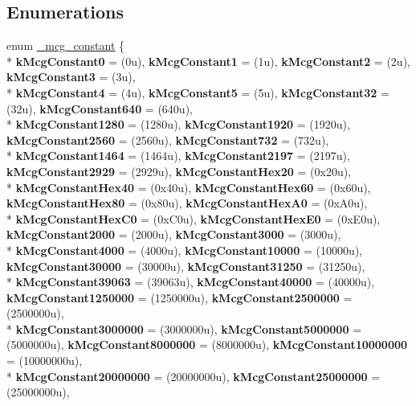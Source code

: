 \subsection*{Enumerations}
\begin{DoxyCompactItemize}
\item 
enum \hyperlink{group__mcg__hal_gaadd12e80f98bc09e584342e08503ba56}{\+\_\+mcg\+\_\+constant} \{ \\*
{\bfseries k\+Mcg\+Constant0} = (0u), 
{\bfseries k\+Mcg\+Constant1} = (1u), 
{\bfseries k\+Mcg\+Constant2} = (2u), 
{\bfseries k\+Mcg\+Constant3} = (3u), 
\\*
{\bfseries k\+Mcg\+Constant4} = (4u), 
{\bfseries k\+Mcg\+Constant5} = (5u), 
{\bfseries k\+Mcg\+Constant32} = (32u), 
{\bfseries k\+Mcg\+Constant640} = (640u), 
\\*
{\bfseries k\+Mcg\+Constant1280} = (1280u), 
{\bfseries k\+Mcg\+Constant1920} = (1920u), 
{\bfseries k\+Mcg\+Constant2560} = (2560u), 
{\bfseries k\+Mcg\+Constant732} = (732u), 
\\*
{\bfseries k\+Mcg\+Constant1464} = (1464u), 
{\bfseries k\+Mcg\+Constant2197} = (2197u), 
{\bfseries k\+Mcg\+Constant2929} = (2929u), 
{\bfseries k\+Mcg\+Constant\+Hex20} = (0x20u), 
\\*
{\bfseries k\+Mcg\+Constant\+Hex40} = (0x40u), 
{\bfseries k\+Mcg\+Constant\+Hex60} = (0x60u), 
{\bfseries k\+Mcg\+Constant\+Hex80} = (0x80u), 
{\bfseries k\+Mcg\+Constant\+Hex\+A0} = (0x\+A0u), 
\\*
{\bfseries k\+Mcg\+Constant\+Hex\+C0} = (0x\+C0u), 
{\bfseries k\+Mcg\+Constant\+Hex\+E0} = (0x\+E0u), 
{\bfseries k\+Mcg\+Constant2000} = (2000u), 
{\bfseries k\+Mcg\+Constant3000} = (3000u), 
\\*
{\bfseries k\+Mcg\+Constant4000} = (4000u), 
{\bfseries k\+Mcg\+Constant10000} = (10000u), 
{\bfseries k\+Mcg\+Constant30000} = (30000u), 
{\bfseries k\+Mcg\+Constant31250} = (31250u), 
\\*
{\bfseries k\+Mcg\+Constant39063} = (39063u), 
{\bfseries k\+Mcg\+Constant40000} = (40000u), 
{\bfseries k\+Mcg\+Constant1250000} = (1250000u), 
{\bfseries k\+Mcg\+Constant2500000} = (2500000u), 
\\*
{\bfseries k\+Mcg\+Constant3000000} = (3000000u), 
{\bfseries k\+Mcg\+Constant5000000} = (5000000u), 
{\bfseries k\+Mcg\+Constant8000000} = (8000000u), 
{\bfseries k\+Mcg\+Constant10000000} = (10000000u), 
\\*
{\bfseries k\+Mcg\+Constant20000000} = (20000000u), 
{\bfseries k\+Mcg\+Constant25000000} = (25000000u), 

\end{DoxyCompactItemize}
